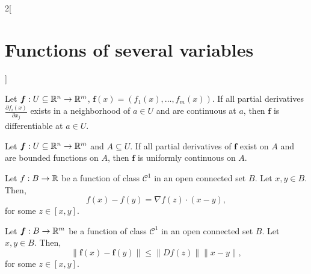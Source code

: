 \documentclass[../../../main.tex]{subfiles}
\begin{document}
\begin{multicols}{2}[\section{Functions of several variables}]
\begin{definition}
\end{definition}
\begin{theorem}
Let $\boldsymbol{f}:U\subseteq\mathbb{R}^n\rightarrow\mathbb{R}^m$, $\boldsymbol{f}(x)=(f_1(x),\ldots,f_m(x))$. If all partial derivatives $\displaystyle \frac{\partial f_i(x)}{\partial x_j}$ exists in a neighborhood of $a\in U$ and are continuous at $a$, then $\boldsymbol{f}$ is differentiable at $a\in U$.
\end{theorem}
\begin{prop}
Let $\boldsymbol{f}:U\subseteq\mathbb{R}^n\rightarrow\mathbb{R}^m$ and $A\subseteq U$. If all partial derivatives of $\boldsymbol{f}$ exist on $A$ and are bounded functions on $A$, then $\boldsymbol{f}$ is uniformly continuous on $A$.
\end{prop}
\begin{theorem}
Let $f:B\rightarrow\mathbb{R} $ be a function of class $\mathcal{C}^1$ in an open connected set $B$. Let $x,y\in B$. Then, $$f(x)-f(y)=\nabla f(z)\cdot(x-y),$$ for some $z\in[x,y]$.
\end{theorem}
\begin{theorem}
Let $\boldsymbol{f}:B\rightarrow\mathbb{R}^m$ be a function of class $\mathcal{C}^1$ in an open connected set $B$. Let $x,y\in B$. Then, $$\|\boldsymbol{f}(x)-\boldsymbol{f}(y)\|\leq\|Df(z)\|\|x-y\|,$$ for some $z\in[x,y]$.
\end{theorem}

\end{multicols}
\end{document}
